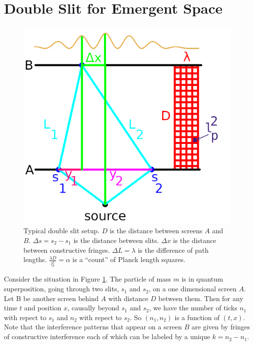 \documentclass[12pt,a4paper]{article}
\begin{document}
\section{Double Slit for Emergent Space}


\begin{figure}[h!]
\centering
\includegraphics[scale=0.5]{double_slit.png}
\caption{Typical double slit setup.  $D$ is the distance between screens $A$ and $B$. $\Delta s = s_2 - s_1$ is the distance between slits.  $\Delta x$ is the distance between constructive fringes. $\Delta L = \lambda$ is the difference of path lengths.  $\frac{\lambda D}{l_p^2} = \alpha$ is a ``count'' of Planck length squares.}
\label{screen}
\end{figure}


Consider the situation in Figure \ref{screen}.  The particle of mass $m$ is in quantum superposition, going through two slits, $s_1$ and $s_2$, on a one dimensional screen $A$. Let B be another screen behind $A$ with distance $D$ between them. Then for any time $t$ and position $x$, causally beyond $s_1$ and $s_2$, we have the number of ticks $n_1$ with repect to $s_1$ and $n_2$ with repect to $s_2$. So $(n_1,n_2)$ is a function of $(t,x)$. Note that the interference patterns that appear on a screen $B$ are given by fringes of constructive interference each of which can be labeled by a unique $k = n_2 - n_1$.
\end{document}
